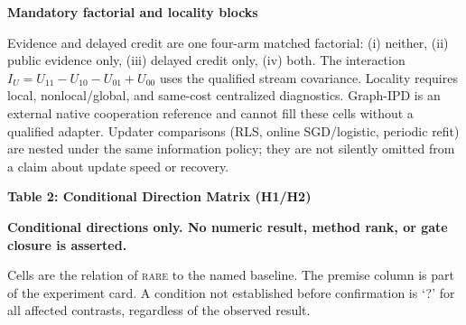 \documentclass[10pt,a4paper]{article}
\newcommand{\rare}{\textsc{rare}}
\newcommand{\lead}[1]{\vspace{3pt}\textbf{#1}\par}
\newcommand{\caution}{\textcolor{red!70!black}{\textbf{Conditional directions only. No numeric result, method rank, or gate closure is asserted.}}\par}
\begin{document}
\lead{Mandatory factorial and locality blocks}
Evidence and delayed credit are one four-arm matched factorial: (i) neither,
(ii) public evidence only, (iii) delayed credit only, (iv) both. The interaction
$I_U=U_{11}-U_{10}-U_{01}+U_{00}$ uses the qualified stream covariance. Locality
requires local, nonlocal/global, and same-cost centralized diagnostics. Graph-IPD is
an external native cooperation reference and cannot fill these cells without a
qualified adapter. Updater comparisons (RLS, online SGD/logistic, periodic refit)
are nested under the same information policy; they are not silently omitted from a
claim about update speed or recovery.

\clearpage
{\large\bfseries Table 2: Conditional Direction Matrix (H1/H2)}\par\caution
Cells are the relation of \rare{} to the named baseline. The premise column is part
of the experiment card. A condition not established before confirmation is `?' for all
affected contrasts, regardless of the observed result.
\end{document}

